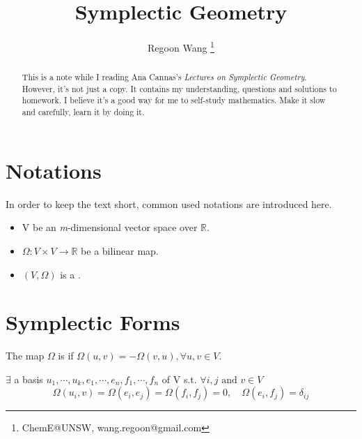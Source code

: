 \documentclass[4paper]{article}
\begin{document}
 
\title{Symplectic Geometry}
\author{Regoon Wang  
\footnote{ChemE@UNSW, wang.regoon@gmail.com}} 


\maketitle
\begin{abstract}
This is a note while I reading Ana Cannas's \textit{Lectures on Symplectic Geometry}. However, it's not
just a copy. It contains my understanding, questions and solutions to homework. I believe it's a good 
way for me to self-study mathematics. Make it slow and carefully, learn it by doing it.
\end{abstract} 

\tableofcontents
\section{Notations}
In order to keep the text short, common used notations are introduced here.
\begin{itemize}
\item V be an \textit{m}-dimensional vector space over $\mathbb{R}$. 
\item $\Omega:V\times V\rightarrow \mathbb{R}$ be a bilinear map.
\item $(V,\Omega)$ is a .
\end{itemize}
\section{Symplectic Forms}
\begin{definition}
The map $\Omega$  is  if $\Omega(u,v)=-\Omega(v,u), \forall u,v\in V$.
\end{definition}
\begin{thm}\label{thm:2.1}
$\exists$ a basis $u_1,\cdots,u_k,e_1,\cdots,e_n,f_1,\cdots,f_n$ of V s.t. $\forall i,j \text{ and } 
v\in V$
\begin{equation*}
\Omega(u_i,v)=\Omega(e_i,e_j)=\Omega(f_i,f_j)=0,\quad\Omega(e_i,f_j)=\delta_{ij}
\end{equation*}
\end{thm}
\end{document}

